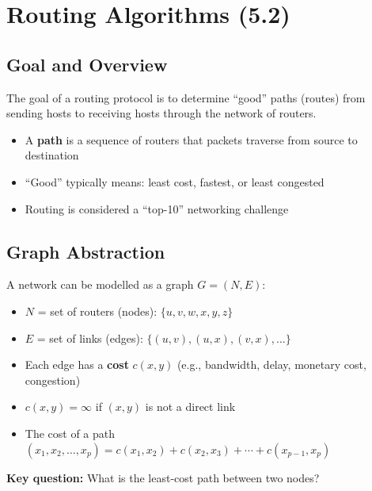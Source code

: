 \begin{imagebox}
\end{imagebox}

\section{Routing Algorithms (5.2)}

\subsection{Goal and Overview}

\begin{keybox}
The goal of a routing protocol is to determine ``good'' paths (routes) from sending hosts to receiving hosts through the network of routers.
\begin{itemize}[noitemsep]
    \item A \textbf{path} is a sequence of routers that packets traverse from source to destination
    \item ``Good'' typically means: least cost, fastest, or least congested
    \item Routing is considered a ``top-10'' networking challenge
\end{itemize}
\end{keybox}

\subsection{Graph Abstraction}

\begin{keybox}
A network can be modelled as a graph $G = (N, E)$:
\begin{itemize}[noitemsep]
    \item $N$ = set of routers (nodes): $\{u, v, w, x, y, z\}$
    \item $E$ = set of links (edges): $\{(u,v), (u,x), (v,x), \ldots\}$
    \item Each edge has a \textbf{cost} $c(x,y)$ (e.g., bandwidth, delay, monetary cost, congestion)
    \item $c(x,y) = \infty$ if $(x,y)$ is not a direct link
    \item The cost of a path $(x_1, x_2, \ldots, x_p) = c(x_1,x_2) + c(x_2,x_3) + \cdots + c(x_{p-1},x_p)$
\end{itemize}

\textbf{Key question:} What is the least-cost path between two nodes?
\end{keybox}

